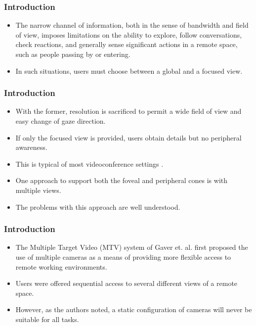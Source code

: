 \documentclass{beamer}
\begin{document}
\begin{frame}
\frametitle{Introduction}

\begin{itemize}
\item The narrow channel of information, both in the sense of bandwidth and field of view, imposes limitations on the ability to explore, follow conversations, check reactions, and generally sense significant actions in a remote space, such as people passing by or entering.
\item In such situations, users must choose between a global and a focused view.
\end{itemize}

\end{frame}

\begin{frame}
\frametitle{Introduction}

\begin{itemize}
\item With the former, resolution is sacrificed to permit a wide field of view and easy change of gaze direction.
\item If only the focused view is provided, users obtain details but no peripheral awareness.
\item This is typical of most videoconference settings  .
\item One approach to support both the foveal and peripheral cones is with multiple views.
\item The problems with this approach are well understood.
\end{itemize}

\end{frame}

\begin{frame}
\frametitle{Introduction}

\begin{itemize}
\item The Multiple Target Video (MTV) system of Gaver et. al.  first proposed the use of multiple cameras as a means of providing more flexible access to remote working environments.
\item Users were offered sequential access to several different views of a remote space.
\item However, as the authors noted, a static configuration of cameras will never be suitable for all tasks.
\end{itemize}

\end{frame}
\end{document}
